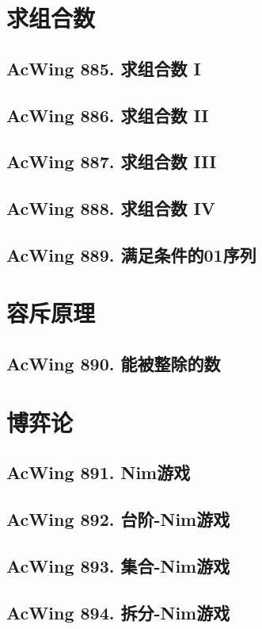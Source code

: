 \section{求组合数}

\subsection{AcWing 885. 求组合数 I}

\subsection{AcWing 886. 求组合数 II}

\subsection{AcWing 887. 求组合数 III}

\subsection{AcWing 888. 求组合数 IV}

\subsection{AcWing 889. 满足条件的01序列}


\section{容斥原理}

\subsection{AcWing 890. 能被整除的数}


\section{博弈论}

\subsection{AcWing 891. Nim游戏}

\subsection{AcWing 892. 台阶-Nim游戏}

\subsection{AcWing 893. 集合-Nim游戏}

\subsection{AcWing 894. 拆分-Nim游戏}
